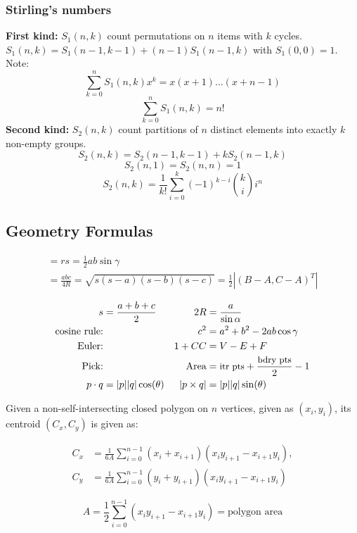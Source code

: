 \documentclass[
	a4paper,
	landscape,
	10pt,
]{article}
\begin{document}
\begin{multicols}{3}
		\subsubsection*{Stirling's numbers} \textbf{First kind:} $S_1(n, k)$ count permutations on $n$ items
		with $k$ cycles. $S_1(n, k) = S_1(n-1, k-1) + (n-1)S_1(n-1, k)$ with
		$S_1(0, 0) = 1$. Note:
		$$\sum_{k=0}^n S_1(n, k)x^k = x(x+1)\dots(x+n-1)$$
		$$ \sum_{k=0}^n S_1(n, k) = n! $$
		\textbf{Second kind:} $S_2(n, k)$ count partitions of $n$
		distinct elements into exactly $k$ non-empty groups.
		$$ S_2(n, k) = S_2(n-1, k-1) + kS_2(n-1, k)$$
		$$S_2(n, 1) = S_2(n, n) = 1$$
		$$ S_2(n, k) = \frac{1}{k!}\sum_{i=0}^k (-1)^{k-i}\binom{k}{i}i^n $$

		\subsection{Geometry Formulas}
		\begin{gather*}
			[ABC]
			= rs
			= \frac 12 ab\sin\gamma \\
			= \frac{abc}{4R}
			= \sqrt{s(s-a)(s-b)(s-c)}
			= \frac 12\left| (B-A, C-A)^T \right|
		\end{gather*}

		\begin{align*}
			s &= \frac {a+b+c}2 & 2R &=\frac{a}{\sin \alpha}\\
			\textrm{cosine rule:}&&  c^2 &= a^2 + b^2 - 2ab\cos \gamma\\
			\textrm{Euler:}&&  1 + CC &= V - E + F\\
            \textrm{Pick:}&& \textrm{Area} &= {\small \textrm{itr pts}
            + \frac{\textrm{bdry pts}}2 - 1}\\
			p\cdot q &= |p||q|\cos(\theta) & |p\times q| &= |p||q|\sin(\theta)\\
		\end{align*}

		Given a non-self-intersecting closed polygon on $n$ vertices, given as $(x_i, y_i)$, its centroid $(C_x, C_y)$ is given as:

		\begin{align*}
			C_x &= \frac{1}{6A} \sum_{i = 0}^{n - 1} (x_i + x_{i+1}) (x_i y_{i+1} - x_{i+1} y_i), \\
			C_y &= \frac{1}{6A} \sum_{i = 0}^{n - 1} (y_i + y_{i+1}) (x_i y_{i+1} - x_{i+1} y_i)
		\end{align*}

		\begin{equation*}
			A = \frac{1}{2} \sum_{i = 0}^{n - 1} (x_i y_{i+1} - x_{i+1} y_i) = \textrm{polygon area}
		\end{equation*}


\end{multicols}
\end{document}
